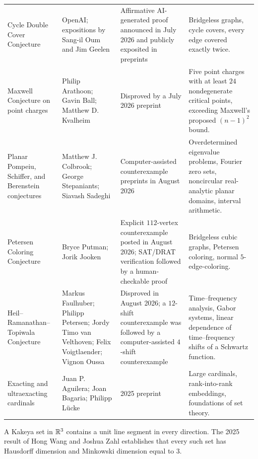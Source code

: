 {\begin{longtable}{@{}L{0.25\textwidth}L{0.22\textwidth}L{0.18\textwidth}L{0.27\textwidth}@{}}
        Cycle Double Cover Conjecture
        & OpenAI; expositions by Sang-il Oum and Jim Geelen
        & Affirmative AI-generated proof announced in July 2026 and publicly
          exposited in preprints
        & Bridgeless graphs, cycle covers, every edge covered exactly twice. \\

        Maxwell Conjecture on point charges
        & Philip Arathoon; Gavin Ball; Matthew D. Kvalheim
        & Disproved by a July 2026 preprint
        & Five point charges with at least $24$ nondegenerate critical points,
          exceeding Maxwell's proposed $(n-1)^2$ bound. \\

        Planar Pompeiu, Schiffer, and Berenstein conjectures
        & Matthew J. Colbrook; George Stepaniants; Siavash Sadeghi
        & Computer-assisted counterexample preprints in August 2026
        & Overdetermined eigenvalue problems, Fourier zero sets, noncircular
          real-analytic planar domains, interval arithmetic. \\

        Petersen Coloring Conjecture
        & Bryce Putman; Jorik Jooken
        & Explicit $112$-vertex counterexample posted in August 2026; SAT/DRAT
          verification followed by a human-checkable proof
        & Bridgeless cubic graphs, Petersen coloring, normal $5$-edge-coloring. \\

        Heil--Ramanathan--Topiwala Conjecture
        & Markus Faulhuber; Philipp Petersen; Jordy Timo van Velthoven; Felix
          Voigtlaender; Vignon Oussa
        & Disproved in August 2026; a $12$-shift counterexample was followed by
          a computer-assisted $4$-shift counterexample
        & Time--frequency analysis, Gabor systems, linear dependence of
          time--frequency shifts of a Schwartz function. \\

        Exacting and ultraexacting cardinals
        & Juan P. Aguilera; Joan Bagaria; Philipp L\"ucke
        & 2025 preprint
        & Large cardinals, rank-into-rank embeddings, foundations of set theory. \\
    \end{longtable}
    }

    \begin{theorem}
        A Kakeya set in $\mathbb{R}^3$ contains a unit line segment in every direction.
        The 2025 result of Hong Wang and Joshua Zahl establishes that every such
        set has Hausdorff dimension and Minkowski dimension equal to $3$.
    \end{theorem}

